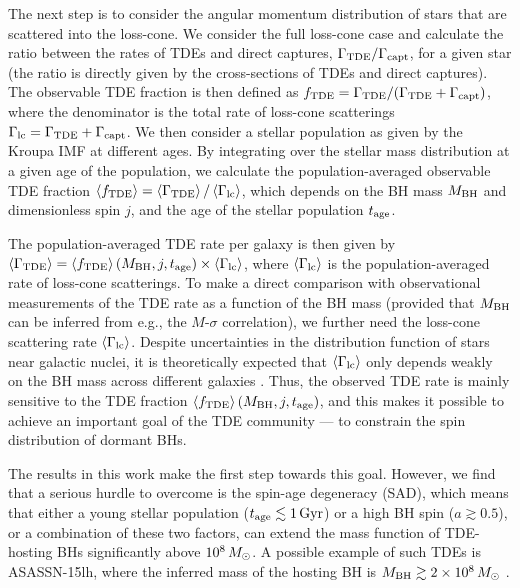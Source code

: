 \documentclass[useAMS,usenatbib]{mn2e}
\def\msun{M_{\rm \odot}}
\def\mBH{M_{\rm BH}}
\def\GammaTDE{\Gamma_{\rm TDE}}
\def\Gammacapt{\Gamma_{\rm capt}}
\def\Gammalc{\Gamma_{\rm lc}}
\def\fTDE{f_{\rm TDE}}
\def\tage{t_{\rm age}}
\newcommand{\lara}[1]{\left\langle{#1}\right\rangle}
\begin{document}
The next step is to consider the angular momentum distribution of stars that are scattered into the loss-cone. We consider the full loss-cone case and calculate the ratio between the rates of TDEs and direct captures, $\GammaTDE/\Gammacapt$, for a given star (the ratio is directly given by the cross-sections of TDEs and direct captures). The observable TDE fraction is then defined as $\fTDE = \GammaTDE/(\GammaTDE + \Gammacapt)$, where the denominator is the total rate of loss-cone scatterings $\Gammalc = \GammaTDE + \Gammacapt$. We then consider a stellar population as given by the Kroupa IMF at different ages. By integrating over the stellar mass distribution at a given age of the population, we calculate the population-averaged observable TDE fraction $\lara{\fTDE} = \lara{\GammaTDE}/\lara{\Gammalc}$, which depends on the BH mass $\mBH$ and dimensionless spin $j$, and the age of the stellar population $\tage$.

The population-averaged TDE rate per galaxy is then given by $\lara{\GammaTDE} = \lara{\fTDE}(\mBH, j, \tage) \times \lara{\Gammalc}$, where $\lara{\Gammalc}$ is the population-averaged rate of loss-cone scatterings. To make a direct comparison with observational measurements of the TDE rate as a function of the BH mass (provided that $\mBH$ can be inferred from e.g., the $M$-$\sigma$ correlation), we further need the loss-cone scattering rate $\lara{\Gammalc}$. Despite uncertainties in the distribution function of stars near galactic nuclei, it is theoretically expected that $\lara{\Gammalc}$ only depends weakly on the BH mass across different galaxies \citep[e.g.,][]{wang04_TDE_rate, Merritt2013, stone16_TDE_rate}. Thus, the observed TDE rate is mainly sensitive to the TDE fraction $\lara{\fTDE}(\mBH, j, \tage)$, and this makes it possible to achieve an important goal of the TDE community --- to constrain the spin distribution of dormant BHs.

The results in this work make the first step towards this goal. However, we find that a serious hurdle to overcome is the spin-age degeneracy (SAD), which means that either a young stellar population ($\tage\lesssim 1\rm\, Gyr$) or a high BH spin ($a\gtrsim 0.5$), or a combination of these two factors, can extend the mass function of TDE-hosting BHs significantly above $10^8\,\msun$. A possible example of such TDEs is ASASSN-15lh, where the inferred mass of the hosting BH is $\mBH\gtrsim 2\times10^{8}\,\msun$ \citep{leloudas16_AS15lh}. 
\end{document}

